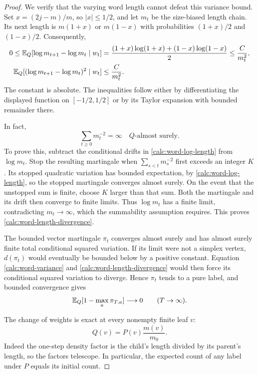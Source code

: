 \begin{proof}
We verify that the varying word length cannot defeat this variance
bound. Set $x=(2j-m)/m$, so $|x|\le1/2$, and let $m_t$ be the
size-biased length chain. Its next length is $m(1+x)$ or $m(1-x)$
with probabilities $(1+x)/2$ and $(1-x)/2$. Consequently,
\begin{align}
 0\le\mathbb E_Q[\log m_{t+1}-\log m_t\mid w_t]
 &=\frac{(1+x)\log(1+x)+(1-x)\log(1-x)}2
 \le\frac{C}{m_t^2},\notag\\
 \mathbb E_Q[(\log m_{t+1}-\log m_t)^2\mid w_t]
 &\le\frac{C}{m_t^2}.
 \label{calc:word-log-length}
\end{align}
The constant is absolute. The inequalities follow either by
differentiating the displayed function on $[-1/2,1/2]$ or by its
Taylor expansion with bounded remainder there.

In fact,
\begin{equation}
 \sum_{t\ge0}m_t^{-2}=\infty\quad Q\text{-almost surely}.
 \label{calc:word-length-divergence}
\end{equation}
To prove this, subtract the conditional drifts in
\eqref{calc:word-log-length} from $\log m_t$. Stop the resulting
martingale when $\sum_{s<t}m_s^{-2}$ first exceeds an integer $K$.
Its stopped quadratic variation has bounded expectation, by
\eqref{calc:word-log-length}, so the stopped martingale converges
almost surely. On the event that the unstopped sum is finite, choose
$K$ larger than that sum. Both the martingale and its drift then
converge to finite limits. Thus $\log m_t$ has a finite limit,
contradicting $m_t\to\infty$, which the summability assumption
requires. This proves \eqref{calc:word-length-divergence}.

The bounded vector martingale $\pi_t$ converges almost surely and
has almost surely finite total conditional squared variation. If
its limit were not a simplex vertex, $d(\pi_t)$ would eventually
be bounded below by a positive constant. Equation
\eqref{calc:word-variance} and
\eqref{calc:word-length-divergence} would then force its conditional
squared variation to diverge. Hence $\pi_t$ tends to a pure label,
and bounded convergence gives
\begin{equation}
 \mathbb E_Q[1-\max_a\pi_{T,a}]\longrightarrow0
 \qquad(T\to\infty).
 \label{calc:word-impurity}
\end{equation}

The change of weights is exact at every nonempty finite leaf $v$:
\begin{equation}
 Q(v)=P(v)\frac{m(v)}{m_0}.
 \label{calc:word-size-bias}
\end{equation}
Indeed the one-step density factor is the child's length divided
by its parent's length, so the factors telescope. In particular,
the expected count of any label under $P$ equals its initial count.


\end{proof}
